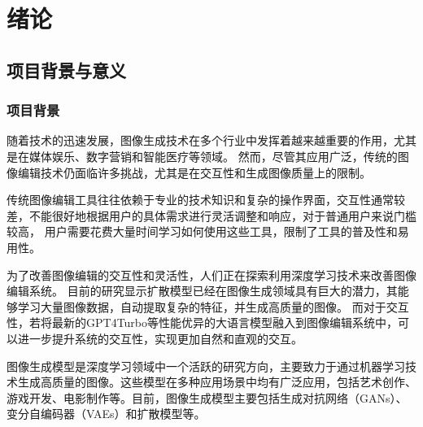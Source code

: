 \documentclass[a4paper,AutoFakeBold,oneside,12pt]{book}
\begin{document}
%   

%   

%   

%  


\frontmatter
\tableofcontents %

\newpage\mainmatter
{}



\chapter{绪论} %
\section{项目背景与意义}
\subsection{项目背景}
随着技术的迅速发展，图像生成技术在多个行业中发挥着越来越重要的作用，尤其是在媒体娱乐、数字营销和智能医疗等领域。
然而，尽管其应用广泛，传统的图像编辑技术仍面临许多挑战，尤其是在交互性和生成图像质量上的限制。

传统图像编辑工具往往依赖于专业的技术知识和复杂的操作界面，交互性通常较差，不能很好地根据用户的具体需求进行灵活调整和响应，对于普通用户来说门槛较高，
用户需要花费大量时间学习如何使用这些工具，限制了工具的普及性和易用性。

为了改善图像编辑的交互性和灵活性，人们正在探索利用深度学习技术来改善图像编辑系统。
目前的研究显示扩散模型已经在图像生成领域具有巨大的潜力，其能够学习大量图像数据，自动提取复杂的特征，并生成高质量的图像。
而对于交互性，若将最新的GPT4Turbo等性能优异的大语言模型融入到图像编辑系统中，可以进一步提升系统的交互性，实现更加自然和直观的交互。

图像生成模型是深度学习领域中一个活跃的研究方向，主要致力于通过机器学习技术生成高质量的图像。这些模型在多种应用场景中均有广泛应用，包括艺术创作、游戏开发、电影制作等。目前，图像生成模型主要包括生成对抗网络（GANs）、变分自编码器（VAEs）和扩散模型等。
\end{document}
